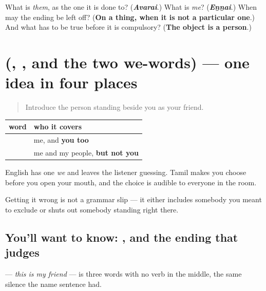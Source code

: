 \begin{tcolorbox}[breakable,colback=teal!4,colframe=teal!35!black,title={Before you move on}]
What is \emph{them}, as the one it is done to? (\emph{\textbf{Avarai}}.) What is \emph{me}? (\emph{\textbf{Eṉṉai}}.) When may the ending be left off? (\textbf{On a thing, when it is not a particular one}.) And what has to be true before it is compulsory? (\textbf{The object is a person}.)
\end{tcolorbox}
\section[\texorpdfstring{(\ta{இவர்}, \ta{விடை}, and the two we-words)}{(இவர், விடை, and the two we-words)}]{(, , and the two we-words) — one idea in four places}

\label{lesson:TA-R86-who-is-in-the-room}



\begin{quote}
Introduce the person standing beside you as your friend.
\end{quote}

\begin{grammarlens}[title={Grammar Lens: the two words for we}]
\noindent
\begin{tabularx}{\linewidth}{@{}>{\raggedright\arraybackslash}X>{\raggedright\arraybackslash}X@{}}
\toprule
\textbf{word} & \textbf{who it covers} \\
\midrule
\textbf{\ta{நாம்}} & me, and \textbf{you too} \\
\textbf{\ta{நாங்கள்}} & me and my people, \textbf{but not you} \\
\bottomrule
\end{tabularx}

English has one \emph{we} and leaves the listener guessing. Tamil makes you choose before you open your mouth, and the choice is audible to everyone in the room.

Getting it wrong is not a grammar slip — it either includes somebody you meant to exclude or shuts out somebody standing right there.
\end{grammarlens}

\subsection*{You'll want to know: , and the ending that judges}
\textbf{  } — \emph{this is my friend} — is three words with no verb in the middle, the same silence the name sentence had.

